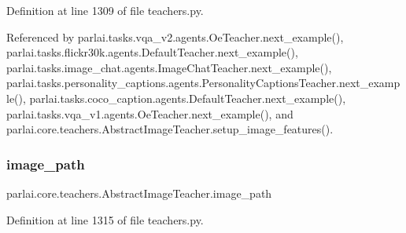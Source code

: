 Definition at line 1309 of file teachers.\+py.



Referenced by parlai.\+tasks.\+vqa\+\_\+v2.\+agents.\+Oe\+Teacher.\+next\+\_\+example(), parlai.\+tasks.\+flickr30k.\+agents.\+Default\+Teacher.\+next\+\_\+example(), parlai.\+tasks.\+image\+\_\+chat.\+agents.\+Image\+Chat\+Teacher.\+next\+\_\+example(), parlai.\+tasks.\+personality\+\_\+captions.\+agents.\+Personality\+Captions\+Teacher.\+next\+\_\+example(), parlai.\+tasks.\+coco\+\_\+caption.\+agents.\+Default\+Teacher.\+next\+\_\+example(), parlai.\+tasks.\+vqa\+\_\+v1.\+agents.\+Oe\+Teacher.\+next\+\_\+example(), and parlai.\+core.\+teachers.\+Abstract\+Image\+Teacher.\+setup\+\_\+image\+\_\+features().

\mbox{\label{classparlai_1_1core_1_1teachers_1_1AbstractImageTeacher_aff2a7f405e051f014ece5cc124aa170c}} 
\subsubsection{\texorpdfstring{image\+\_\+path}{image\_path}}
{\footnotesize\ttfamily parlai.\+core.\+teachers.\+Abstract\+Image\+Teacher.\+image\+\_\+path}



Definition at line 1315 of file teachers.\+py.



